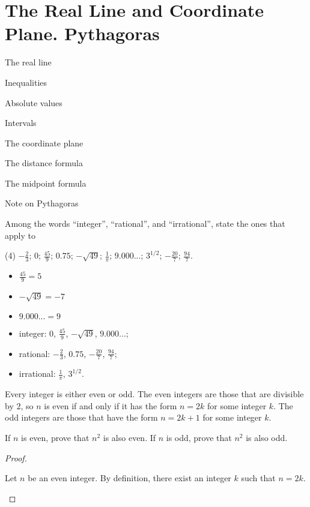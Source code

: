 \section{The Real Line and Coordinate Plane. Pythagoras}
\begin{introduction}
  \item The real line
  \item Inequalities
  \item Absolute values
  \item Intervals
  \item The coordinate plane
  \item The distance formula
  \item The midpoint formula
  \item Note on Pythagoras
\end{introduction}
\begin{questions}
  \item Among the words ``integer'', ``rational'', and ``irrational'', state the ones that apply to
  \begin{tasks}(4)
    \task \( -\frac{2}{3}\);
    \task \(0\);
    \task \(\frac{45}{9}\);
    \task \(0.75\);
    \task \(-\sqrt{49}\);
    \task \(\frac{1}{\pi}\);
    \task \(9.000...\);
    \task \(3^{1/2}\);
    \task \(-\frac{20}{7}\);
    \task \(\frac{94}{7}\).
  \end{tasks}
  \begin{note}
    \begin{itemize}
      \item \(\frac{45}{9} = 5\)
      \item \(-\sqrt{49} = -7\)
      \item \(9.000... = 9\)
    \end{itemize}
  \end{note}
  \begin{solution}
    \begin{itemize}
      \item integer: \(0\), \(\frac{45}{9}\), \(-\sqrt{49}\), \(9.000...\);
      \item rational: \(-\frac{2}{3}\), \(0.75\), \(-\frac{20}{7}\), \(\frac{94}{7}\);
      \item irrational: \(\frac{1}{\pi}\), \(3^{1/2}\).
    \end{itemize}
  \end{solution}
  \item Every integer is either even or odd. The even integers are those that are divisible by $2$, so $n$ is even if and only if it has the form $n=2k$ for some integer $k$. The odd integers are those that have the form $n=2k + 1$ for some integer $k$.
  \begin{tasks}
    \task If $n$ is even, prove that $n^2$ is also even.
    \task If $n$ is odd, prove that $n^2$ is also odd.
  \end{tasks}
  \begin{proof}
    \begin{tasks}
      \task Let $n$ be an even integer. By definition, there exist an integer $k$ such that $n=2k$.


\end{tasks}
\end{proof}
\end{questions}
